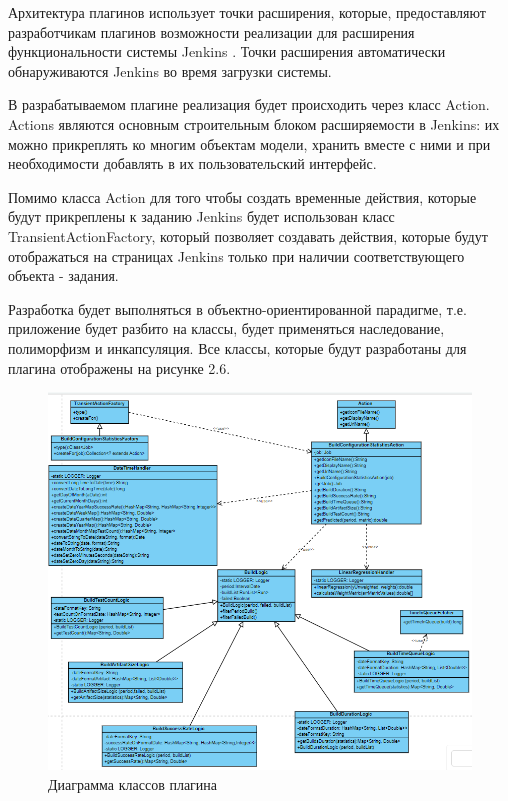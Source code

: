 Архитектура плагинов использует точки расширения, которые, предоставляют разработчикам плагинов возможности реализации для расширения функциональности системы Jenkins \cite{atchplugin}. Точки расширения автоматически обнаруживаются Jenkins во время загрузки системы.

В разрабатываемом плагине реализация будет происходить через класс Action. Actions являются основным строительным блоком расширяемости в Jenkins: их можно прикреплять ко многим объектам модели, хранить вместе с ними и при необходимости добавлять в их пользовательский интерфейс.

Помимо класса Action для того чтобы создать временные действия, которые будут прикреплены к заданию Jenkins будет использован класс TransientActionFactory, который позволяет создавать действия, которые будут отображаться на страницах Jenkins только при наличии соответствующего объекта - задания.

Разработка будет выполняться в объектно-ориентированной парадигме, т.е. приложение будет разбито на классы, будет применяться наследование, полиморфизм и инкапсуляция. Все классы, которые будут разработаны для плагина отображены на рисунке 2.6. 

\begin{figure}[ht!] 
	\center
	\includegraphics [scale=1] {my_folder/images//class3}
	\caption{Диаграмма классов плагина} 
	\label{fig:class3}  
\end{figure}

